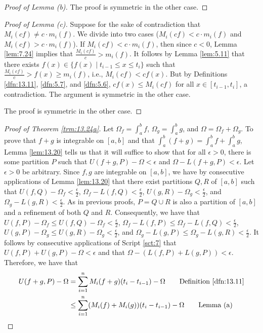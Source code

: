 \documentclass[../main.tex]{subfiles}
\begin{document}
\begin{theorem}
\begin{lemma*}
\begin{proof}[Proof of Lemma \textup{(}b\textup{)}]
            The proof is symmetric in the other case.
        \end{proof}
        \begin{proof}[Proof of Lemma \textup{(}c\textup{)}]
            Suppose for the sake of contradiction that $M_i(cf)\neq c\cdot m_i(f)$. We divide into two cases ($M_i(cf)<c\cdot m_i(f)$ and $M_i(cf)>c\cdot m_i(f)$). If $M_i(cf)<c\cdot m_i(f)$, then since $c<0$, Lemma \ref{lem:7.24} implies that $\frac{M_i(cf)}{c}>m_i(f)$. It follows by Lemma \ref{lem:5.11} that there exists $f(x)\in\{f(x)\mid t_{i-1}\leq x\leq t_i\}$ such that $\frac{M_i(cf)}{c}>f(x)\geq m_i(f)$, i.e., $M_i(cf)<cf(x)$. But by Definitions \ref{dfn:13.11}, \ref{dfn:5.7}, and \ref{dfn:5.6}, $cf(x)\leq M_i(cf)$ for all $x\in[t_{i-1},t_i]$, a contradiction. The argument is symmetric in the other case.\par
            The proof is symmetric in the other case.
        \end{proof}
    \end{lemma*}
    \begin{proof}[Proof of Theorem \ref{trm:13.24a}]
        Let $\Omega_f=\int_a^bf$, $\Omega_g=\int_a^bg$, and $\Omega=\Omega_f+\Omega_g$. To prove that $f+g$ is integrable on $[a,b]$ and that $\int_a^b(f+g)=\int_a^bf+\int_a^bg$, Lemma \ref{lem:13.20} tells us that it will suffice to show that for all $\epsilon>0$, there is some partition $P$ such that $U(f+g,P)-\Omega<\epsilon$ and $\Omega-L(f+g,P)<\epsilon$. Let $\epsilon>0$ be arbitrary. Since $f,g$ are integrable on $[a,b]$, we have by consecutive applications of Lemma \ref{lem:13.20} that there exist partitions $Q,R$ of $[a,b]$ such that $U(f,Q)-\Omega_f<\frac{\epsilon}{2}$, $\Omega_f-L(f,Q)<\frac{\epsilon}{2}$, $U(g,R)-\Omega_g<\frac{\epsilon}{2}$, and $\Omega_g-L(g,R)<\frac{\epsilon}{2}$. As in previous proofs, $P=Q\cup R$ is also a partition of $[a,b]$ and a refinement of both $Q$ and $R$. Consequently, we have that $U(f,P)-\Omega_f\leq U(f,Q)-\Omega_f<\frac{\epsilon}{2}$, $\Omega_f-L(f,P)\leq\Omega_f-L(f,Q)<\frac{\epsilon}{2}$, $U(g,P)-\Omega_g\leq U(g,R)-\Omega_g<\frac{\epsilon}{2}$, and $\Omega_g-L(g,P)\leq\Omega_g-L(g,R)<\frac{\epsilon}{2}$. It follows by consecutive applications of Script \ref{sct:7} that $U(f,P)+U(g,P)-\Omega<\epsilon$ and that $\Omega-(L(f,P)+L(g,P))<\epsilon$. Therefore, we have that
        \begin{align*}
            U(f+g,P)-\Omega &= \sum_{i=1}^nM_i(f+g)(t_i-t_{i-1})-\Omega\tag*{Definition \ref{dfn:13.11}}\\
            &\leq \sum_{i=1}^n(M_i(f)+M_i(g))(t_i-t_{i-1})-\Omega\tag*{Lemma (a)}\\

\end{align*}
\end{proof}
\end{theorem}
\end{document}
